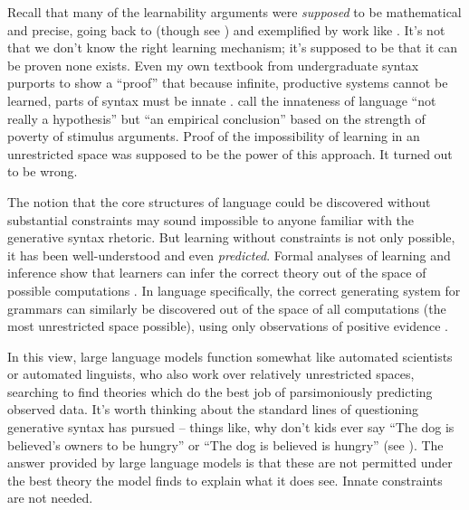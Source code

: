 \documentclass[output=paper,colorlinks,citecolor=brown
]{langscibook}
\begin{document}
Recall that many of the learnability arguments were \textit{supposed} to be mathematical and precise, going back to \citet{gold1967language} (though see \citealt{johnson2004gold,chater2007ideal}) and exemplified by work like . It's not that we don't know the right learning mechanism; it's supposed to be that it can be proven none exists. Even my own textbook from undergraduate syntax purports to show a ``proof'' that because infinite, productive systems cannot be learned, parts of syntax must be innate \citep{carnie2021syntax}. \citet{legate2002empirical} call the innateness of language ``not really a hypothesis'' but ``an empirical conclusion'' based on the strength of poverty of stimulus arguments. Proof of the impossibility of learning in an unrestricted space was supposed to be the power of this approach. It turned out to be wrong.

The notion that the core structures of language could be discovered without substantial constraints may sound impossible to anyone familiar with the generative syntax rhetoric. But learning without constraints is not only possible, it has been well-understood and even \textit{predicted}. Formal analyses of learning and inference show that learners can infer the correct theory out of the space of possible computations \citep{solomonoff1964formal,hutter2004universal,legg2007universal}. In language specifically, the correct generating system for grammars can similarly be discovered out of the space of all computations (the most unrestricted space possible), using only observations of positive evidence \citep{chater2007ideal}.

In this view, large language models function somewhat like automated scientists or automated linguists, who also work over relatively unrestricted spaces, searching to find theories which do the best job of parsimoniously predicting observed data. It's worth thinking about the standard lines of questioning generative syntax has pursued -- things like, why don't kids ever say ``The dog is believed's owners to be hungry'' or ``The dog is believed is hungry'' (see \citealt{lasnik2016argument}). The answer provided by large language models is that these are not permitted under the best theory the model finds to explain what it does see. Innate constraints are not needed.

\end{document}
